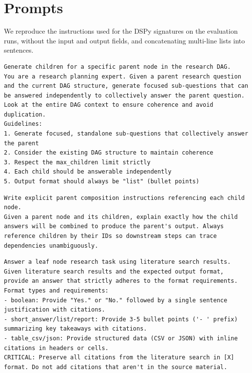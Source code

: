 \section{Prompts}
\label{app:prompts}
We reproduce the instructions used for the DSPy signatures on the evaluation runs, without the input and output fields, and concatenating multi-line lists into sentences.

\begin{lstlisting}[title={LayerChildGenerationSignature (Phase 1, one layer of children)}]
Generate children for a specific parent node in the research DAG.
You are a research planning expert. Given a parent research question and the current DAG structure, generate focused sub-questions that can be answered independently to collectively answer the parent question. Look at the entire DAG context to ensure coherence and avoid duplication.
Guidelines:
1. Generate focused, standalone sub-questions that collectively answer the parent
2. Consider the existing DAG structure to maintain coherence
3. Respect the max_children limit strictly
4. Each child should be answerable independently
5. Output format should always be "list" (bullet points)
\end{lstlisting}

\begin{lstlisting}[title={CompositionInstructionSignature (Phase 1, per parent)}]
Write explicit parent composition instructions referencing each child node.
Given a parent node and its children, explain exactly how the child answers will be combined to produce the parent's output. Always reference children by their IDs so downstream steps can trace dependencies unambiguously.
\end{lstlisting}

\begin{lstlisting}[title={LeafNodeResearcher (Phase 2, leaves)}]
Answer a leaf node research task using literature search results.
Given literature search results and the expected output format, provide an answer that strictly adheres to the format requirements.
Format types and requirements:
- boolean: Provide "Yes." or "No." followed by a single sentence justification with citations.
- short_answer/list/report: Provide 3-5 bullet points ('- ' prefix) summarizing key takeaways with citations.
- table_csv/json: Provide structured data (CSV or JSON) with inline citations in headers or cells.
CRITICAL: Preserve all citations from the literature search in [X] format. Do not add citations that aren't in the source material.
\end{lstlisting}

